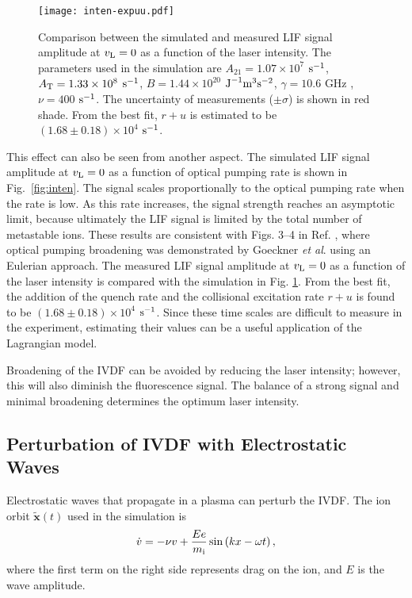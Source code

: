 \documentclass[aip,pop,reprint]{revtex4-1}
\begin{document}
\begin{figure}[t!]
\begin{center}
\texttt{[image: inten-expuu.pdf]}
\caption{Comparison between the simulated and measured LIF signal amplitude at $v_\textup{L}=0$ as a function of the laser intensity. The parameters used in the simulation are $A_{21}=1.07 \times 10^7$ $\textup{s}^{-1}$, $A_{\textup{T}}=1.33 \times 10^8$ $\textup{s}^{-1}$, $B=1.44 \times 10^{20}$ $\textup{J}^{-1} \textup{m}^{3} \textup{s}^{-2}$, $\gamma=10.6$ GHz \cite{whaling_argon_1995}, $\nu=400$ $\textup{s}^{-1}$. The uncertainty of measurements ($\pm \sigma$) is shown in red shade. From the best fit, $r + u$ is estimated to be $(1.68 \pm 0.18) \times 10^4$ $\textup{s}^{-1}$.}
\label{fig:inten-expu}
\end{center}
\end{figure}

This effect can also be seen from another aspect. The simulated LIF signal amplitude at $v_\textup{L}=0$ as a function of optical pumping rate is shown in Fig.~\ref{fig:inten}. The signal scales proportionally to the optical pumping rate when the rate is low. As this rate increases, the signal strength reaches an asymptotic limit, because ultimately the LIF signal is limited by the total number of metastable ions. These results are consistent with Figs. 3--4 in Ref. , where optical pumping broadening was demonstrated by Goeckner \textit{et al}. using an Eulerian approach. The measured LIF signal amplitude at $v_\textup{L}=0$ as a function of the laser intensity is compared with the simulation in Fig. \ref{fig:inten-expu}. From the best fit, the addition of the quench rate and the collisional excitation rate $r+u$ is found to be $(1.68 \pm 0.18) \times 10^4$ $\textup{s}^{-1}$. Since these time scales are difficult to measure in the experiment, estimating their values can be a useful application of the Lagrangian model.

Broadening of the IVDF can be avoided by reducing the laser intensity; however, this will also diminish the fluorescence signal. The balance of a strong signal and minimal broadening determines the optimum laser intensity.

\subsection{Perturbation of IVDF with Electrostatic Waves}
\label{pert}

Electrostatic waves that propagate in a plasma can perturb the IVDF. The ion orbit $\mathbf{\tilde{x}}(t)$ used in the simulation is
\begin{equation}
\label{eq:orbit}
\dot{v}=-\nu v+\frac{Ee}{m_\textup{i}}\sin\left ( kx-\omega t \right ) ,
\end{equation}
where the first term on the right side represents drag on the ion, and $E$ is the wave amplitude.
\end{document}
